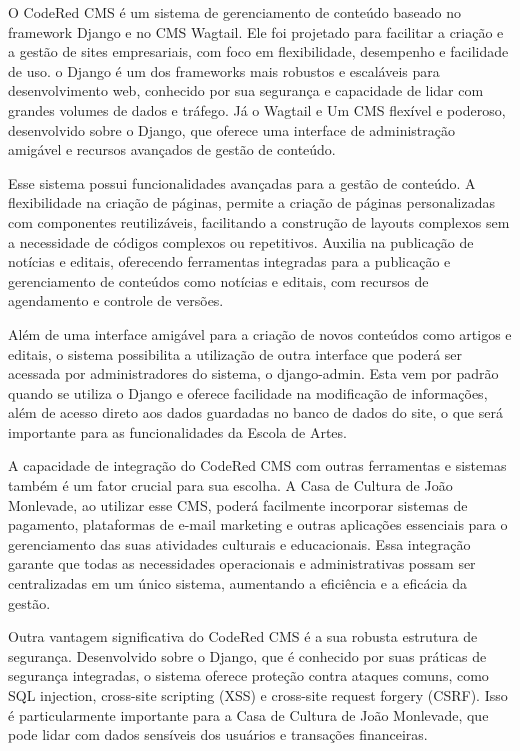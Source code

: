 O CodeRed CMS é um sistema de gerenciamento de conteúdo baseado no framework Django e no CMS Wagtail. Ele foi projetado para facilitar a criação e a gestão de sites empresariais, com foco em flexibilidade, desempenho e facilidade de uso. o Django é um dos frameworks mais robustos e escaláveis para desenvolvimento web, conhecido por sua segurança e capacidade de lidar com grandes volumes de dados e tráfego. Já o Wagtail e Um CMS flexível e poderoso, desenvolvido sobre o Django, que oferece uma interface de administração amigável e recursos avançados de gestão de conteúdo.

Esse sistema possui funcionalidades avançadas para a gestão de conteúdo. A flexibilidade na criação de páginas, permite a criação de páginas personalizadas com componentes reutilizáveis, facilitando a construção de layouts complexos sem a necessidade de códigos complexos ou repetitivos. Auxilia na publicação de notícias e editais, oferecendo ferramentas integradas para a publicação e gerenciamento de conteúdos como notícias e editais, com recursos de agendamento e controle de versões.

Além de uma interface amigável para a criação de novos conteúdos como artigos e editais, o sistema possibilita a utilização de outra interface que poderá ser acessada por administradores do sistema, o django-admin. Esta vem por padrão quando se utiliza o Django e oferece facilidade na modificação de informações, além de acesso direto aos dados guardadas no banco de dados do site, o que será importante para as funcionalidades da Escola de Artes.

A capacidade de integração do CodeRed CMS com outras ferramentas e sistemas também é um fator crucial para sua escolha. A Casa de Cultura de João Monlevade, ao utilizar esse CMS, poderá facilmente incorporar sistemas de pagamento, plataformas de e-mail marketing e outras aplicações essenciais para o gerenciamento das suas atividades culturais e educacionais. Essa integração garante que todas as necessidades operacionais e administrativas possam ser centralizadas em um único sistema, aumentando a eficiência e a eficácia da gestão.

Outra vantagem significativa do CodeRed CMS é a sua robusta estrutura de segurança. Desenvolvido sobre o Django, que é conhecido por suas práticas de segurança integradas, o sistema oferece proteção contra ataques comuns, como SQL injection, cross-site scripting (XSS) e cross-site request forgery (CSRF). Isso é particularmente importante para a Casa de Cultura de João Monlevade, que pode lidar com dados sensíveis dos usuários e transações financeiras.

